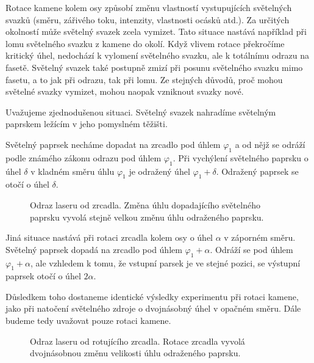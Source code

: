 Rotace kamene kolem osy způsobí změnu vlastností vystupujících světelných svazků (směru, zářivého toku, intenzity, vlastnosti ocásků atd.). Za určitých okolností může světelný svazek zcela vymizet. Tato situace nastává například při lomu světelného svazku z kamene do okolí. Když vlivem rotace překročíme kritický úhel, nedochází k vylomení světelného svazku, ale k totálnímu odrazu na fasetě. Světelný svazek také postupně zmizí při posunu světelného svazku mimo fasetu, a to jak při odrazu, tak při lomu. Ze stejných důvodů, proč mohou světelné svazky vymizet, mohou naopak vzniknout svazky nové.

Uvažujeme zjednodušenou situaci. Světelný svazek nahradíme světelným paprskem ležícím v jeho pomyslném těžišti. 

Světelný paprsek necháme dopadat na zrcadlo pod úhlem $\varphi_1$ a od nějž se odráží podle známého zákonu odrazu pod úhlem $\varphi_1$. Při vychýlení světelného paprsku o úhel $ \delta $ v kladném směru úhlu $\varphi_1$ je odražený úhel $\varphi_1 + \delta$. Odražený paprsek se otočí o úhel $ \delta $.

\begin{figure}[h!]
\begin{center}
\scalebox{1}{ }
\end{center}
\caption{Odraz laseru od zrcadla. Změna úhlu dopadajícího světelného paprsku vyvolá stejně velkou změnu úhlu odraženého paprsku.}
\label{fig:odraz laser}
\end{figure}

Jiná situace nastává při rotaci zrcadla kolem osy o úhel $\alpha$ v záporném směru. Světelný paprsek dopadá na zrcadlo pod úhlem $\varphi_1 + \alpha$. Odráží se pod úhlem $\varphi_1+\alpha$, ale vzhledem k tomu, že vstupní parsek je ve stejné pozici, se výstupní paprsek otočí o úhel  $2\alpha$. 


Důsledkem toho dostaneme identické výsledky experimentu při rotaci kamene, jako při natočení světelného zdroje o dvojnásobný úhel v opačném směru. Dále budeme tedy uvažovat pouze rotaci kamene. 

\newpage
\begin{figure}[h!]
\begin{center}
\scalebox{1}{ }
\end{center}
\caption{Odraz laseru od rotujícího zrcadla. Rotace zrcadla vyvolá dvojnásobnou změnu velikosti úhlu odraženého paprsku.}
\label{fig:odraz zrcadlo}
\end{figure}

